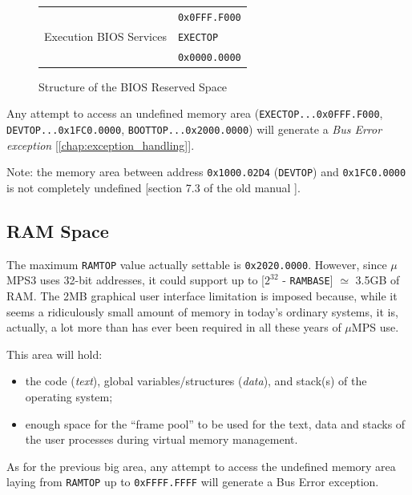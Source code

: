 \documentclass[12pt,a4paper,openright,twoside]{report}
\begin{document}
\begin{figure}[ht]
\begin{tabular}{cl}
		\multicolumn{1}{|c|}{}                                              & \multirow{2}{*}{\texttt{0x0FFF.F000}} \\ \cline{1-1}
		\multicolumn{1}{|l|}{\multirow{2}{*}{\cellcolor{gray}}}             &                                       \\ [-3ex]
		\multicolumn{1}{|l|}{\cellcolor{gray}}                              & \multirow{2}{*}{\texttt{EXECTOP}}     \\ \cline{1-1}
		\multicolumn{1}{|c|}{\multirow{2}{*}{Execution BIOS Services}}      &                                       \\ [-1ex]
		\multicolumn{1}{|c|}{}                                              & \multirow{2}{*}{\texttt{0x0000.0000}} \\ \cline{1-1}
		\multicolumn{1}{l}{}                                                &
	\end{tabular}
	\caption{Structure of the BIOS Reserved Space}
	\label{fig:kernel_reserved_space}
\end{figure}
Any attempt to access an undefined memory area (\texttt{EXECTOP...0x0FFF.F000}, \texttt{DEVTOP...0x1FC0.0000}, \texttt{BOOTTOP...0x2000.0000}) will generate a \textit{Bus Error exception} [\autoref{chap:exception_handling}].

Note: the memory area between address \texttt{0x1000.02D4} (\texttt{DEVTOP}) and \texttt{0x1FC0.0000} is not completely undefined [section 7.3 of the old manual \cite{old_pops}].

\subsection{RAM Space}
The maximum \texttt{RAMTOP} value actually settable is \texttt{0x2020.0000}.
However, since $\mu$MPS3 uses 32-bit addresses, it could support up to [$2^{32}$ - \texttt{RAMBASE}] $\simeq$ 3.5GB of RAM.
The 2MB graphical user interface limitation is imposed because, while it seems a ridiculously small amount of memory in today's ordinary systems, it is, actually, a lot more than has ever been required in all these years of $\mu$MPS use.

This area will hold:
\begin{itemize}
	\item the code (\textit{text}), global variables/structures (\textit{data}), and stack(s) of the operating system;
	\item enough space for the ``frame pool'' to be used for the text, data and stacks of the user processes during virtual memory management.
\end{itemize}
As for the previous big area, any attempt to access the undefined memory area laying from \texttt{RAMTOP} up to \texttt{0xFFFF.FFFF} will generate a Bus Error exception.
\end{document}
